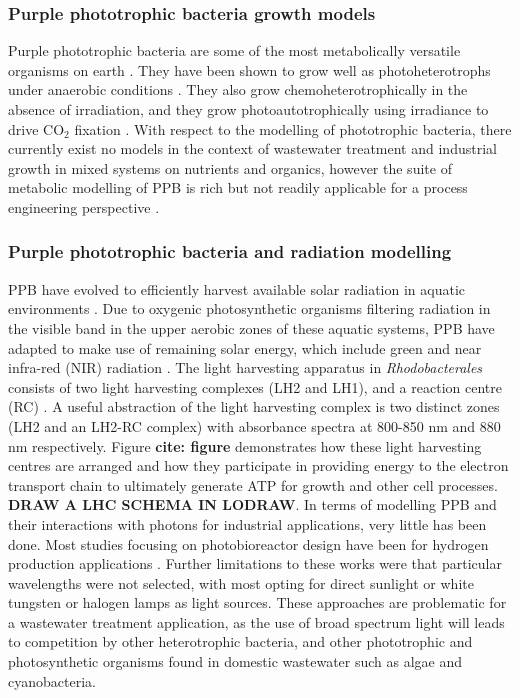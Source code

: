 \subsubsection{Purple phototrophic bacteria growth models}
Purple phototrophic bacteria are some of the most metabolically versatile organisms on earth \cite{Hunter2008}. They have been shown to grow well as photoheterotrophs under anaerobic conditions \cite{Hulsen2014}. They also grow chemoheterotrophically in the absence of irradiation, and they grow photoautotrophically using irradiance to drive $\mathrm{CO_2}$ fixation \cite{Gordon2014}. With respect to the modelling of phototrophic bacteria, there currently exist no models in the context of wastewater treatment and industrial growth in mixed systems on nutrients and organics, however the suite of metabolic modelling of PPB is rich but not readily applicable for a process engineering perspective \cite{Klamt2002}.
\subsubsection{Purple phototrophic bacteria and radiation modelling}
PPB have evolved to efficiently harvest available solar radiation in aquatic environments \cite{Cogdell2006a}. Due to oxygenic photosynthetic organisms filtering radiation in the visible band in the upper aerobic zones of these aquatic systems, PPB have adapted to make use of remaining solar energy, which include green and near infra-red (NIR) radiation \cite{Cogdell2006a}. The light harvesting apparatus in \textit{Rhodobacterales} consists of two light harvesting complexes (LH2 and LH1), and a reaction centre (RC) \cite{Hellingwerf1994}. A useful abstraction of the light harvesting complex is two distinct zones (LH2 and an LH2-RC complex) with absorbance spectra at 800-850 \si{nm} and 880 \si{nm} respectively. Figure \textbf{cite: figure} demonstrates how these light harvesting centres are arranged and how they participate in providing energy to the electron transport chain to ultimately generate ATP for growth and other cell processes. \textbf{DRAW A LHC SCHEMA IN LODRAW}.
\skippingparagraph
In terms of modelling PPB and their interactions with photons for industrial applications, very little has been done. Most studies focusing on photobioreactor design have been for hydrogen production applications \cite{Adessi2014, Krujatz2015}. Further limitations to these works were that particular wavelengths were not selected, with most opting for direct sunlight or white tungsten or halogen lamps as light sources. These approaches are problematic for a wastewater treatment application, as the use of broad spectrum light will leads to competition by other heterotrophic bacteria, and other phototrophic and photosynthetic organisms found in domestic wastewater such as algae and cyanobacteria.
\skippingparagraph

